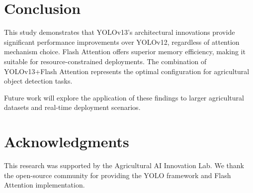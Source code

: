 \documentclass[11pt,a4paper]{article}
\begin{document}
\section{Conclusion}

This study demonstrates that YOLOv13's architectural innovations provide significant performance improvements over YOLOv12, regardless of attention mechanism choice. Flash Attention offers superior memory efficiency, making it suitable for resource-constrained deployments. The combination of YOLOv13+Flash Attention represents the optimal configuration for agricultural object detection tasks.

Future work will explore the application of these findings to larger agricultural datasets and real-time deployment scenarios.

\section*{Acknowledgments}
This research was supported by the Agricultural AI Innovation Lab. We thank the open-source community for providing the YOLO framework and Flash Attention implementation.



\end{document}

